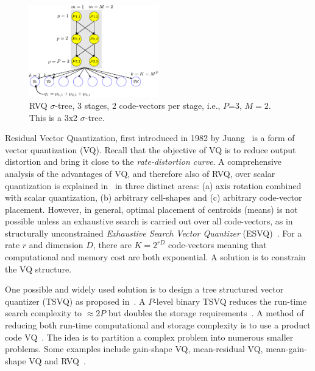 \documentclass{article}
\begin{document}
\begin{figure}[t]
\centering	
\includegraphics[width=0.5\textwidth]{figs/RVQ_trellis.pdf}
\caption{RVQ $\sigma$-tree, 3 stages, 2 code-vectors per stage, i.e., $P$=3, $M=2$.  This is a 3x2 $\sigma$-tree.} 
\label{fig:RVQ_sigma_tree}				
\end{figure}


Residual Vector Quantization, first introduced in 1982 by Juang~\cite{1982_CNF_SpeechRVQ_JuangGray} is a form of vector quantization (VQ).  Recall that the objective of VQ is to reduce output distortion and bring it close to the \emph{rate-distortion curve}.  A comprehensive analysis of the advantages of VQ, and therefore also of RVQ, over scalar quantization is explained in~\cite{1985_JNL_VQ_Makhoul} in three distinct areas: (a) axis rotation combined with scalar quantization, (b) arbitrary cell-shapes and (c) arbitrary code-vector placement.   However, in general, optimal placement of centroids (means) is not possible unless an exhaustive search is carried out over all code-vectors, as in structurally unconstrained \emph{Exhaustive Search Vector Quantizer} (ESVQ)~\cite{1996_JNL_AdvancesRVQ_Barnes}.  For a rate $r$ and dimension $D$, there are $K=2^{rD}$ code-vectors meaning that computational and memory cost are both exponential.  A solution is to constrain the VQ structure.  

One possible and widely used solution is to design a tree structured vector quantizer (TSVQ) as proposed in~\cite{1980_JNL_TSVQ_Buzo}.  A $P$-level binary TSVQ reduces the run-time search complexity to $\approx 2P$ but doubles the storage requirements~\cite{1996_JNL_AdvancesRVQ_Barnes}.    A method of reducing both run-time computational and storage complexity is to use a product code VQ~\cite{1991_BOOK_VQ_GershoGray}.  The idea is to partition a complex problem into numerous smaller problems.  Some examples include gain-shape VQ, mean-residual VQ, mean-gain-shape VQ and RVQ~\cite{1996_JNL_AdvancesRVQ_Barnes}.  
\end{document}
